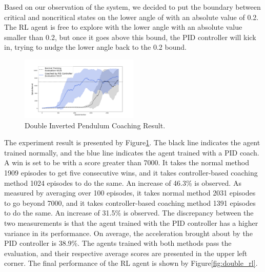 \documentclass[journal]{IEEEtran}
\begin{document}
Based on our observation of the system, we decided to put the boundary between critical and noncritical states on the lower angle of with an absolute value of 0.2. The RL agent is free to explore with the lower angle with an absolute value smaller than 0.2, but once it goes above this bound, the PID controller will kick in, trying to nudge the lower angle back to the 0.2 bound.

\begin{figure}[H]
     \centering
      \includegraphics[width=0.5\textwidth]{double.png}
      \caption{Double Inverted Pendulum Coaching Result.}
      \label{fig:double_result}
\end{figure}

The experiment result is presented by Figure\ref{fig:double_result}. The black line indicates the agent trained normally, and the blue line indicates the agent trained with a PID coach. A win is set to be with a score greater than 7000. It takes the normal method 1909 episodes to get five consecutive wins, and it takes controller-based coaching method 1024 episodes to do the same. An increase of 46.3\% is observed. As measured by averaging over 100 episodes, it takes normal method 2031 episodes to go beyond 7000, and it takes controller-based coaching method 1391 episodes to do the same. An increase of 31.5\% is observed. The discrepancy between the two measurements is that the agent trained with the PID controller has a higher variance in its performance. On average, the acceleration brought about by the PID controller is 38.9\%. The agents trained with both methods pass the evaluation, and their respective average scores are presented in the upper left corner. The final performance of the RL agent is shown by Figure\ref{fig:double_rl}.
\end{document}
